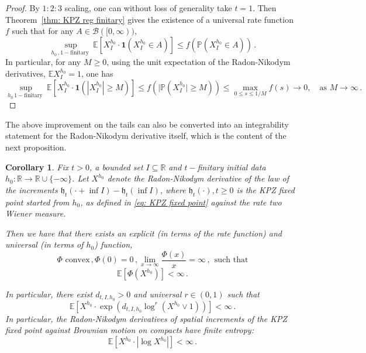 \documentclass[11pt, reqno]{amsart}
\numberwithin{equation}{section}
\newcounter{dummy} \numberwithin{dummy}{section}
\newtheorem{corollary}[dummy]{Corollary}
\newcommand{\R}{\ensuremath{\mathbb{R}}}
\newcommand{\PP}{\ensuremath{\mathbb{P}}}
\begin{document}
\begin{proof}
    By $1:2:3$ scaling, one can without loss of generality take $t=1$. Then Theorem~\ref{thm: KPZ reg finitary} gives the existence of a universal rate function $f$ such that for any $A\in \mathcal{B}([0,\infty))$, 
    \begin{equation*}
    \displaystyle\sup_{h_0\,,1-\text{finitary }}\mathbb{E}[X^{h_0}_I \cdot \mathbf{1}(X^{h_0}_I\in A)]\le f(\PP(X^{h_0}_I\in A))\,.
    \end{equation*}
    In particular, for any $M\ge 0$, using the unit expectation of the Radon-Nikodym derivatives, $\mathbb{E}X^{h_0}_I = 1$,
    one has
    \begin{equation*}
    \displaystyle\sup_{h_0\,1-\text{finitary }}\mathbb{E}[X^{h_0}_I \cdot \mathbf{1}(|X^{h_0}_I|\ge M)]\le f(|\PP(X^{h_0}_I|\ge M))\le \displaystyle\max_{0\le s \le 1/M}f(s)\to 0 ,\quad\text{as } M\to \infty\,.
    \end{equation*}
\end{proof}

The above improvement on the tails can also be converted into an integrability statement for the Radon-Nikodym derivative itself, which is the content of the next proposition.

\begin{corollary}\label{cor: interpolation orlicz}
    Fix $t>0$, a bounded set $I\subseteq \R$ and $t-$finitary initial data $h_0:\R\to \R\cup\{-\infty\}$. Let $X^{h_0}$ denote the Radon-Nikodym derivative of the law of the increments $\mathfrak{h}_t(\cdot + \inf I) - \mathfrak{h}_t(\inf I)$, where $\mathfrak{h}_t(\cdot), t\ge 0$ is the KPZ fixed point started from $h_0$, as defined in \eqref{eq: KPZ fixed point} against the rate two Wiener measure.
    
    Then we have that there exists an explicit (in terms of the rate function) and universal (in terms of $h_0$) function,
    \begin{equation*}
    \Phi\text{ convex}\,, \Phi(0) = 0\,, \lim_{x\to \infty}\frac{\Phi(x)}{x} = \infty\,, \ \ \mbox {such that}
    \end{equation*}
    \begin{equation*}
    \mathbb{E}[\Phi(X^{h_0})]<\infty\,.
    \end{equation*}

    In particular, there exist $d_{t, I, h_0} > 0$ and universal $r \in (0, 1)$ such that
    \begin{equation*}
    \mathbb{E}[X^{h_0}\cdot \exp(d_{t, I, h_0}\log^{r} (X^{h_0}\lor 1))]<\infty\,.
    \end{equation*}
    In particular, the Radon-Nikodym derivatives of spatial increments of the KPZ fixed point against Brownian motion on compacts have \emph{finite entropy}:
    \begin{equation*}
    \mathbb{E}[X^{h_0}\cdot |\log X^{h_0}|]<\infty\,.
    \end{equation*}
\end{corollary}
\end{document}
